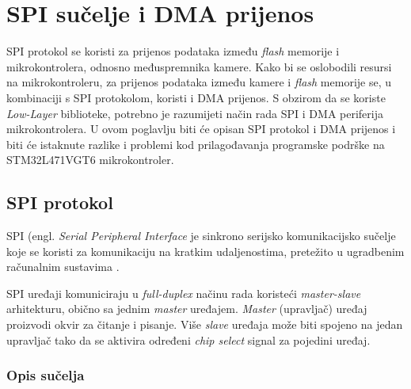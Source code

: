 \chapter{SPI sučelje i DMA prijenos}

SPI protokol se koristi za prijenos podataka između \textit{flash} memorije i mikrokontrolera, odnosno međuspremnika kamere. Kako bi se oslobodili resursi na mikrokontroleru, za prijenos podataka između kamere i \textit{flash} memorije se, u kombinaciji s SPI protokolom, koristi i DMA prijenos. S obzirom da se koriste \textit{Low-Layer} biblioteke, potrebno je razumijeti način rada SPI i DMA periferija mikrokontrolera. U ovom poglavlju biti će opisan SPI protokol i DMA prijenos i biti će istaknute razlike i problemi kod prilagođavanja programske podrške na STM32L471VGT6 mikrokontroler.

\section{SPI protokol}

SPI (engl. \textit{Serial Peripheral Interface} je sinkrono serijsko komunikacijsko sučelje koje se koristi za komunikaciju na kratkim udaljenostima, pretežito u ugradbenim računalnim sustavima \cite{spi_wikipedia}. 

SPI uređaji komuniciraju u \textit{full-duplex} načinu rada koristeći \textit{master-slave} arhitekturu, obično sa jednim \textit{master} uređajem. \textit{Master} (upravljač) uređaj proizvodi okvir za čitanje i pisanje. Više \textit{slave} uređaja može biti spojeno na jedan upravljač tako da se aktivira određeni \textit{chip select} signal za pojedini uređaj.

\subsection{Opis sučelja}

